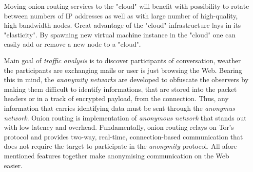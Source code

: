 \documentclass{acm_proc_article-sp}
\begin{document}
Moving onion routing services to the "cloud" will benefit with possibility to rotate between numbers of IP addresses as well as 
with large number of high-quality, high-bandwidth nodes. Great advantage of the "cloud" infrastructure  lays in its "elasticity".
By spawning new virtual machine instance in the "cloud" one can easily add or remove a new node to a "cloud". \cite{cite2}

Main goal of \textit{traffic analysis} is to discover participants of conversation, weather the participants are exchanging mails or 
user is just browsing the Web. Bearing this in mind, the \textit{anonymity networks} are developed to obfuscate the observers 
by making them difficult to identify informations, that are stored into the packet headers or in a track of encrypted payload, from the connection.
Thus, any information that carries identifying data must be sent through the \textit{anonymus  network}. Onion routing is implementation 
of \textit{anonymous network} that stands out with low latency and overhead. Fundamentally, onion routing relays on Tor's protocol and 
provides two-way, real-time, connection-based communication that does not require the target to participate in the \textit{anonymity} protocol.
 All afore mentioned features together make anonymising communication on the Web easier. \cite{cite1} \cite{cite2}
%
%
\end{document}
